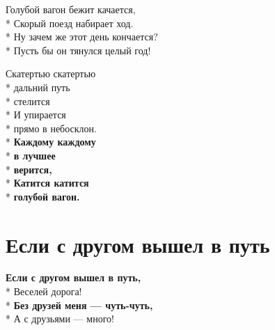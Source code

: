 \medskip

\begin{minipage}{\linewidth}
Голубой вагон бежит качается,\\*
Скорый поезд набирает ход.\\*
Ну зачем же этот день кончается?\\*
Пусть бы он тянулся целый год!\\
\end{minipage}\par\medskip\nobreak

\medskip

\begin{minipage}{\linewidth}
\hspace*{1.5em}Скатертью скатертью\\*
\hspace*{1.5em}дальний путь\\*
\hspace*{1.5em}стелится\\*
\hspace*{1.5em}И упирается\\*
\hspace*{1.5em}прямо в небосклон.\\*
\hspace*{1.5em}\textbf{Каждому каждому}\\*
\hspace*{1.5em}\textbf{в лучшее}\\*
\hspace*{1.5em}\textbf{верится,}\\*
\hspace*{1.5em}\textbf{Катится катится}\\*
\hspace*{1.5em}\textbf{голубой вагон.}\\
\end{minipage}

\vspace{\fill}\newpage

\section{Если с другом вышел в путь}
\label{song:Если_с_другом_вышел_в_путь}

\medskip

\begin{minipage}{\linewidth}
\textbf{Если с другом вышел в путь,}\\*
Веселей дорога!\\*
\textbf{Без друзей меня — чуть-чуть,}\\*
А с друзьями — много!\\
\end{minipage}\par\medskip\nobreak

